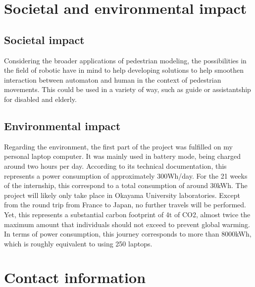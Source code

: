 \documentclass[12pt,a4paper,twoside]{article}
\begin{document}
\section{Societal and environmental impact}

\subsection{Societal impact}
Considering the broader applications of pedestrian modeling, the possibilities in the field of robotic have in mind to help developing solutions to help smoothen interaction between automaton and human in the context of pedestrian movements. This could be used in a variety of way, such as guide or assistantship for disabled and elderly. 

\subsection{Environmental impact}
Regarding the environment, the first part of the project was fulfilled on my personal laptop computer. It was mainly used in battery mode, being charged around two hours per day. According to its technical documentation, this represents a power consumption of approximately 300Wh/day. For the 21 weeks of the internship, this correspond to a total consumption of around 30kWh.
The project will likely only take place in Okayama University laboratories. Except from the round trip from France to Japan, no further travels will be performed. Yet, this represents a substantial carbon footprint of 4t of CO2, almost twice the maximum amount that individuals should not exceed to prevent global warming. In terms of power consumption, this journey corresponds to more than 8000kWh, which is roughly equivalent to using 250 laptops. 

{}


\newpage

\appendix
\section{Contact information}
\end{document}
